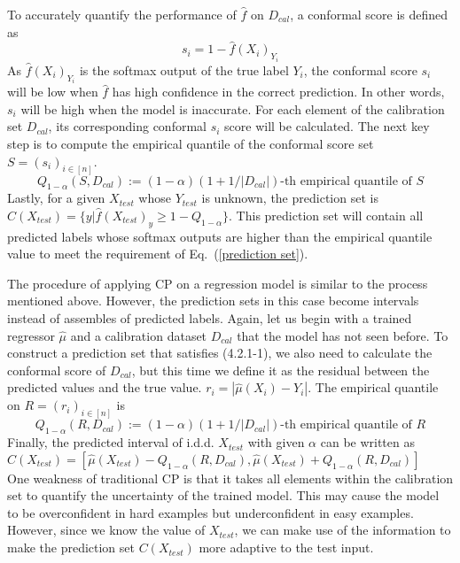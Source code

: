 To accurately quantify the performance of $\hat{f}$ on $D_{cal}$, a conformal score is defined as 
\begin{equation} 
s_i = 1-\hat{f}(X_i)_{Y_i}\tag{4.2.1-2}
\end{equation}
As $\hat{f}(X_i)_{Y_i}$ is the softmax output of the true label $Y_i$, the conformal score $s_i$ will be low when $\hat{f}$ has high confidence in the correct prediction. In other words, $s_i$ will be high when the model is inaccurate. For each element of the calibration set $D_{cal}$, its corresponding conformal $s_i$ score will be calculated. The next key step is to compute the empirical quantile of the conformal score set $S = (s_i)_{i\in[n]}$.
 \begin{equation} 
Q_{1-\alpha}(S,D_{cal}):=(1-\alpha)(1+1/|D_{cal}|)\text{-th empirical quantile of }S \tag{4.2.1-3}
 \end{equation} 
Lastly, for a given $X_{test}$ whose $Y_{test}$ is unknown, the prediction set is $C(X_{test})=\{y|\hat{f}(X_{test})_y\ge 1-Q_{1-\alpha}\}$.  This prediction set will contain all predicted labels whose softmax outputs are higher than the empirical quantile value to meet the requirement of Eq.~(\ref{prediction set}).

The procedure of applying CP on a regression model is similar to the process mentioned above. However, the prediction sets in this case become intervals instead of assembles of predicted labels. Again, let us begin with a trained regressor $\hat{\mu}$ and a calibration dataset $D_{cal}$ that the model has not seen before.  To construct a prediction set that satisfies (4.2.1-1), we also need to calculate the conformal score of $D_{cal}$, but this time we define it as the residual between the predicted values and the true value.
$r_i = |\hat{\mu}(X_i)-Y_i|$.  The empirical quantile on $R = (r_i)_{i\in[n]}$ is
 \begin{equation} 
Q_{1-\alpha}(R,D_{cal}):=(1-\alpha)(1+1/|D_{cal}|)\text{-th empirical quantile of }R \tag{4.2.1-5}
 \end{equation} 
Finally, the predicted interval of i.d.d. $X_{test}$ with given $\alpha$ can be written as $C(X_{test})=[\hat{\mu}(X_{test})-Q_{1-\alpha}(R,D_{cal}),\hat{\mu}(X_{test})+Q_{1-\alpha}(R,D_{cal})]$\\

One weakness of traditional CP is that it takes all elements within the calibration set to quantify the uncertainty of the trained model. This may cause the model to be overconfident in hard examples but underconfident in easy examples.  However, since we know the value of $X_{test}$, we can make use of the information to make the prediction set $C(X_{test})$ more adaptive to the test input. 

